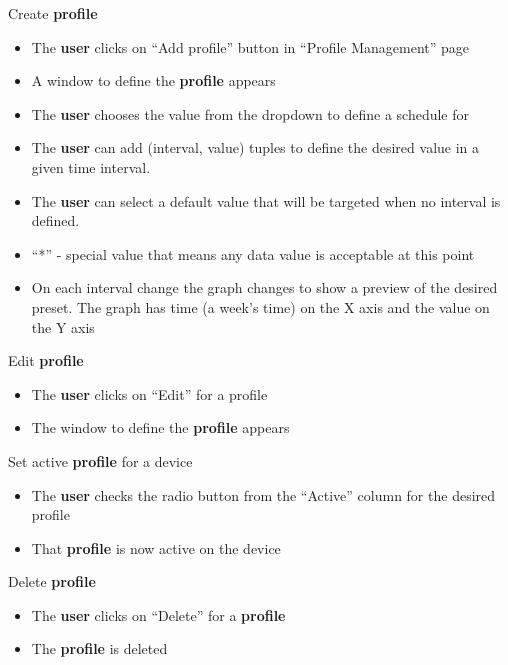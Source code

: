 Create \textbf{profile}
\begin{itemize}
\item The \textbf{user} clicks on “Add profile” button in “Profile Management” page
\item A window to define the \textbf{profile} appears
\item The \textbf{user} chooses the value from the dropdown to define a schedule for
\item The \textbf{user} can add (interval, value) tuples to define the desired value in a given time interval.
\item The \textbf{user} can select a default value that will be targeted when no interval is defined.
\item “*” - special value that means any data value is acceptable at this point
\item On each interval change the graph changes to show a preview of the desired preset. The graph has time (a week’s time) on the X axis and the value on the Y axis
\end{itemize}

Edit \textbf{profile}
\begin{itemize}
\item The \textbf{user} clicks on “Edit” for a profile
\item The window to define the \textbf{profile} appears
\end{itemize}

Set active \textbf{profile} for a device
\begin{itemize}
\item The \textbf{user} checks the radio button from the “Active” column for the desired profile
\item That \textbf{profile} is now active on the device
\end{itemize}

Delete \textbf{profile}
\begin{itemize}
\item The \textbf{user} clicks on “Delete” for a \textbf{profile}
\item The \textbf{profile} is deleted
\end{itemize}
